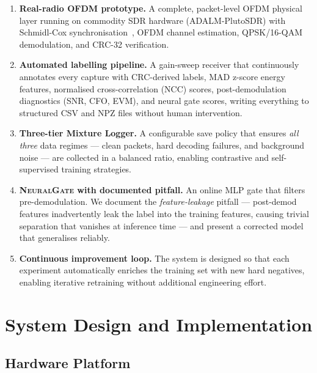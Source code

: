 \documentclass[conference]{IEEEtran}
\newcommand{\gate}{\textsc{NeuralGate}}
\begin{document}
\begin{enumerate}
\item \textbf{Real-radio OFDM prototype.}  A complete, packet-level OFDM
  physical layer running on commodity SDR hardware (ADALM-PlutoSDR)
  with Schmidl-Cox synchronisation~\cite{schmidl1997robust}, OFDM
  channel estimation, QPSK/16-QAM demodulation, and CRC-32 verification.

\item \textbf{Automated labelling pipeline.}  A gain-sweep receiver that
  continuously annotates every capture with CRC-derived labels, MAD
  z-score energy features, normalised cross-correlation (NCC) scores,
  post-demodulation diagnostics (SNR, CFO, EVM), and neural gate scores,
  writing everything to structured CSV and NPZ files without human
  intervention.

\item \textbf{Three-tier Mixture Logger.}  A configurable save policy
  that ensures \emph{all three} data regimes — clean packets, hard
  decoding failures, and background noise — are collected in a balanced
  ratio, enabling contrastive and self-supervised training strategies.

\item \textbf{\gate{} with documented pitfall.}  An online MLP gate that
  filters pre-demodulation.  We document the \emph{feature-leakage}
  pitfall — post-demod features inadvertently leak the label into the
  training features, causing trivial separation that vanishes at inference
  time — and present a corrected model that generalises reliably.

\item \textbf{Continuous improvement loop.}  The system is designed so
  that each experiment automatically enriches the training set with new
  hard negatives, enabling iterative retraining without additional
  engineering effort.
\end{enumerate}

\section{System Design and Implementation}
\label{sec:system}

\subsection{Hardware Platform}
\label{sec:hardware}
\end{document}
